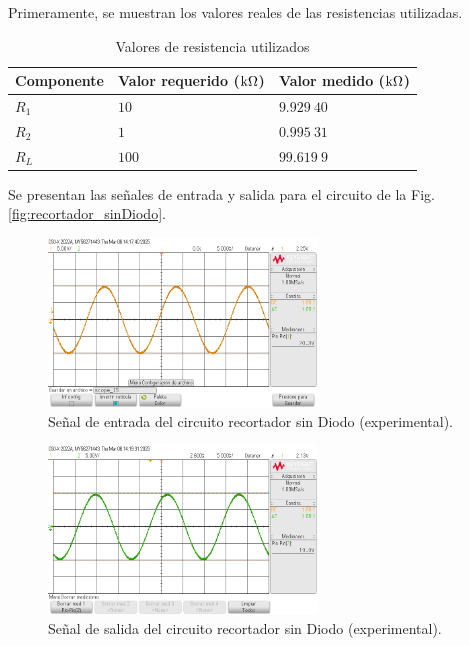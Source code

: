 \documentclass[journal]{IEEEtran}
\begin{document}
Primeramente, se muestran los valores reales de las resistencias utilizadas. 

\begin{table}[H]
        \centering
        \renewcommand{\arraystretch}{1.5}
        \caption{Valores de resistencia utilizados}
        \begin{tabular}{ m{2cm} m{2cm} m{2cm} }
            \hline
            Componente & Valor requerido ($\textnormal{k}\Omega$) & Valor medido ($\textnormal{k}\Omega$) \\ 
            \hline
            $R_1$ & $10$ & $9.929~40$ \\ 
            $R_2$ & $1$ & $0.995~31$ \\
            $R_L$ & $100$ & $99.619~9$ \\
            \hline
        \end{tabular}
        \label{tabla1}
    \end{table}
    

Se presentan las señales de entrada y salida para el circuito de la Fig. \ref{fig:recortador_sinDiodo}.
\begin{figure}[H]
        \centering
        \includegraphics[width=2.8in]{SignalExperimental_01.png}
        \caption{Señal de entrada del circuito recortador sin Diodo (experimental).}
        \label{fig:SignalExperimental_01}
\end{figure}
\begin{figure}[H]
        \centering
        \includegraphics[width=2.8in]{SignalExperimental_02.png}
        \caption{Señal de salida del circuito recortador sin Diodo (experimental).}
        \label{fig:SignalExperimental_02}
\end{figure}
\end{document}
